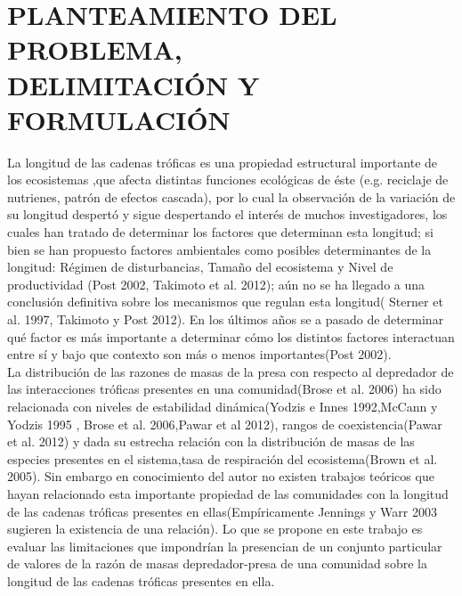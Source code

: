 \documentclass[a4paper,12pt]{article}
\begin{document}
\tableofcontents

\section{PLANTEAMIENTO DEL PROBLEMA,\\ DELIMITACI\'ON Y FORMULACI\'ON}
La longitud de las cadenas tr\'oficas es una propiedad estructural importante de los ecosistemas
,que afecta distintas funciones ecol\'ogicas de \'este (e.g. reciclaje de nutrienes, patr\'on de efectos cascada), por lo cual  la observaci\'on de la variaci\'on de su longitud despert\'o y sigue despertando el inter\'es de muchos investigadores, los cuales han tratado de determinar los factores que determinan esta longitud; si bien se han propuesto factores ambientales como posibles determinantes de la longitud: R\'egimen de disturbancias, Tama\~no del ecosistema y Nivel de productividad (Post 2002, Takimoto et al. 2012); a\'un no se ha llegado a una conclusi\'on definitiva sobre los mecanismos que regulan esta longitud( Sterner et al. 1997, Takimoto y Post 2012). En los \'ultimos a\~nos se a pasado de determinar qu\'e factor es m\'as importante a determinar c\'omo los distintos factores interactuan entre s\'i y bajo que contexto son m\'as o menos importantes(Post 2002).\\
La distribuci\'on de las razones de masas de la presa con respecto al depredador de las interacciones tr\'oficas presentes en una comunidad(Brose et al. 2006) ha sido relacionada con niveles de estabilidad din\'amica(Yodzis e Innes 1992,McCann y Yodzis 1995 , Brose et al. 2006,Pawar et al 2012), rangos de coexistencia(Pawar et al. 2012) y dada su estrecha relaci\'on con la distribuci\'on de masas de las especies presentes en el sistema,tasa de respiraci\'on del ecosistema(Brown et al. 2005). Sin embargo en conocimiento del autor no existen trabajos te\'oricos que hayan relacionado esta importante propiedad de las comunidades con la longitud de las cadenas tr\'oficas presentes en ellas(Emp\'iricamente Jennings y Warr 2003 sugieren la existencia de una relaci\'on).
Lo que se propone en este trabajo es evaluar las limitaciones que impondr\'ian la presencian de un conjunto particular de valores de la raz\'on de masas depredador-presa de una comunidad sobre la longitud de las cadenas tr\'oficas presentes en ella.
\end{document}
